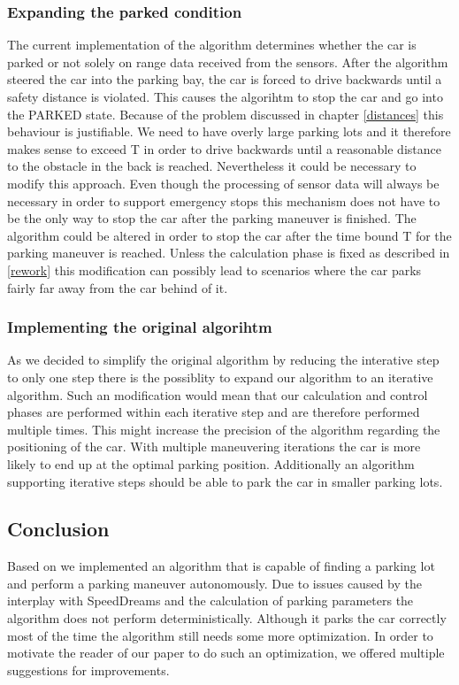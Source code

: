 \documentclass[paper=a4, fontsize=11pt]{scrreprt}
\begin{document}
\subsubsection{Expanding the parked condition}
The current implementation of the algorithm determines whether the car is parked or not solely on range data received from the sensors. After the algorithm steered the car into the parking bay, the car is forced to drive backwards until a safety distance is violated. This causes the algorihtm to stop the car and go into the PARKED state.
Because of the problem discussed in chapter \ref{distances} this behaviour is justifiable. We need to have overly large parking lots and it therefore makes sense to exceed T in order to drive backwards until a reasonable distance to the obstacle in the back is reached.
Nevertheless it could be necessary to modify this approach. Even though the processing of sensor data will always be necessary in order to support emergency stops this mechanism does not have to be the only way to stop the car after the parking maneuver is finished. The algorithm could be altered in order to stop the car after the time bound T for the parking maneuver is reached. 
Unless the calculation phase is fixed as described in \ref{rework} this modification can possibly lead to scenarios where the car parks fairly far away from the car behind of it.
\subsubsection{Implementing the original algorihtm}
As we decided to simplify the original algorithm by reducing the interative step to only one step there is the possiblity to expand our algorithm to an iterative algorithm. Such an modification would mean that our calculation and control phases are performed within each iterative step and are therefore performed multiple times. This might increase the precision of the algorithm regarding the positioning of the car. With multiple maneuvering iterations the car is more likely to end up at the optimal parking position. Additionally an algorithm supporting iterative steps should be able to park the car in smaller parking lots. 
\subsection{Conclusion}
Based on \cite{mgcpav} we implemented an algorithm that is capable of finding a parking lot and perform a parking maneuver autonomously. Due to issues caused by the interplay with SpeedDreams and the calculation of  parking parameters the algorithm does not perform deterministically. Although it parks the car correctly most of the time the algorithm still needs some more optimization. In order to motivate the reader of our paper to do such an optimization, we offered multiple suggestions for improvements.

\end{document}
